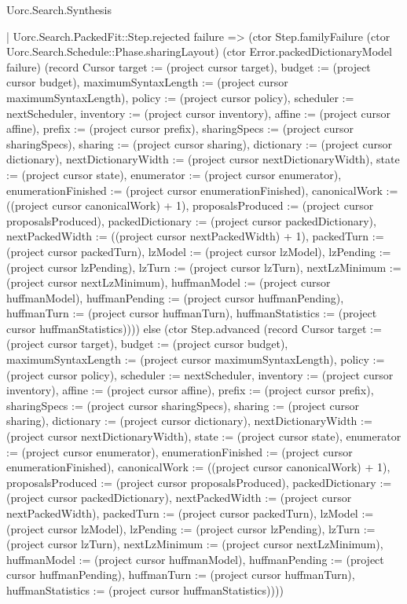 \begin{lexlean}{Uorc.Search.Synthesis}
\begin{semanticmodule}
{      | Uorc.Search.PackedFit::Step.rejected failure => (ctor Step.familyFailure (ctor Uorc.Search.Schedule::Phase.sharingLayout) (ctor Error.packedDictionaryModel failure) (record Cursor {target := (project cursor target), budget := (project cursor budget), maximumSyntaxLength := (project cursor maximumSyntaxLength), policy := (project cursor policy), scheduler := nextScheduler, inventory := (project cursor inventory), affine := (project cursor affine), prefix := (project cursor prefix), sharingSpecs := (project cursor sharingSpecs), sharing := (project cursor sharing), dictionary := (project cursor dictionary), nextDictionaryWidth := (project cursor nextDictionaryWidth), state := (project cursor state), enumerator := (project cursor enumerator), enumerationFinished := (project cursor enumerationFinished), canonicalWork := ((project cursor canonicalWork) + 1), proposalsProduced := (project cursor proposalsProduced), packedDictionary := (project cursor packedDictionary), nextPackedWidth := ((project cursor nextPackedWidth) + 1), packedTurn := (project cursor packedTurn), lzModel := (project cursor lzModel), lzPending := (project cursor lzPending), lzTurn := (project cursor lzTurn), nextLzMinimum := (project cursor nextLzMinimum), huffmanModel := (project cursor huffmanModel), huffmanPending := (project cursor huffmanPending), huffmanTurn := (project cursor huffmanTurn), huffmanStatistics := (project cursor huffmanStatistics)}))) else (ctor Step.advanced (record Cursor {target := (project cursor target), budget := (project cursor budget), maximumSyntaxLength := (project cursor maximumSyntaxLength), policy := (project cursor policy), scheduler := nextScheduler, inventory := (project cursor inventory), affine := (project cursor affine), prefix := (project cursor prefix), sharingSpecs := (project cursor sharingSpecs), sharing := (project cursor sharing), dictionary := (project cursor dictionary), nextDictionaryWidth := (project cursor nextDictionaryWidth), state := (project cursor state), enumerator := (project cursor enumerator), enumerationFinished := (project cursor enumerationFinished), canonicalWork := ((project cursor canonicalWork) + 1), proposalsProduced := (project cursor proposalsProduced), packedDictionary := (project cursor packedDictionary), nextPackedWidth := (project cursor nextPackedWidth), packedTurn := (project cursor packedTurn), lzModel := (project cursor lzModel), lzPending := (project cursor lzPending), lzTurn := (project cursor lzTurn), nextLzMinimum := (project cursor nextLzMinimum), huffmanModel := (project cursor huffmanModel), huffmanPending := (project cursor huffmanPending), huffmanTurn := (project cursor huffmanTurn), huffmanStatistics := (project cursor huffmanStatistics)})))
}
\end{semanticmodule}
\end{lexlean}
